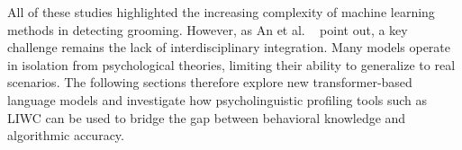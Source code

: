 All of these studies highlighted the increasing complexity of machine learning methods in detecting grooming. However, as An et al. \ \parencite{an2025cybergrooming} point out, a key challenge remains the lack of interdisciplinary integration. Many models operate in isolation from psychological theories, limiting their ability to generalize to real scenarios. The following sections therefore explore new transformer-based language models and investigate how psycholinguistic profiling tools such as LIWC can be used to bridge the gap between behavioral knowledge and algorithmic accuracy.










